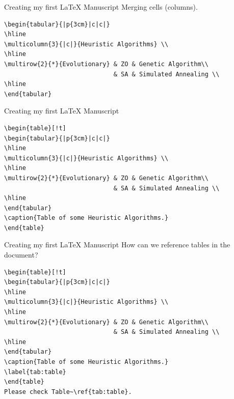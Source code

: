 \begin{frame}[fragile]{Creating my first \LaTeX{} Manuscript}
Merging cells (columns).
\footnotesize
\begin{verbatim}
\begin{tabular}{|p{3cm}|c|c|}
\hline
\multicolumn{3}{|c|}{Heuristic Algorithms} \\
\hline
\multirow{2}{*}{Evolutionary} & ZO & Genetic Algorithm\\ 
                              & SA & Simulated Annealing \\ 
\hline
\end{tabular}
\end{verbatim}
\end{frame}

\begin{frame}[fragile]{Creating my first \LaTeX{} Manuscript}
\footnotesize
\begin{verbatim}
\begin{table}[!t]
\begin{tabular}{|p{3cm}|c|c|}
\hline
\multicolumn{3}{|c|}{Heuristic Algorithms} \\
\hline
\multirow{2}{*}{Evolutionary} & ZO & Genetic Algorithm\\ 
                              & SA & Simulated Annealing \\ 
\hline
\end{tabular}
\caption{Table of some Heuristic Algorithms.}
\end{table}
\end{verbatim}
\end{frame}


\begin{frame}[fragile]{Creating my first \LaTeX{} Manuscript}
How can we reference tables in the document?
\footnotesize
\begin{verbatim}
\begin{table}[!t]
\begin{tabular}{|p{3cm}|c|c|}
\hline
\multicolumn{3}{|c|}{Heuristic Algorithms} \\
\hline
\multirow{2}{*}{Evolutionary} & ZO & Genetic Algorithm\\ 
                              & SA & Simulated Annealing \\ 
\hline
\end{tabular}
\caption{Table of some Heuristic Algorithms.}
\label{tab:table}
\end{table}
Please check Table~\ref{tab:table}.
\end{verbatim}
\end{frame}

